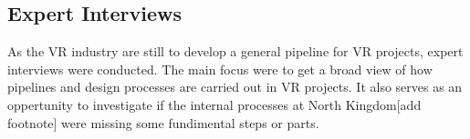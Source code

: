 \subsection{Expert Interviews}
As the VR industry are still to develop a general pipeline for VR projects, expert interviews were conducted. The main focus were to get a broad view of how pipelines and design processes are carried out in VR projects. It also serves as an oppertunity to investigate if the internal processes at North Kingdom[add footnote] were missing some fundimental steps or parts.
